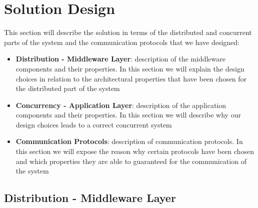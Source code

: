\section{Solution Design}

This section will describe the solution in terms of the distributed and concurrent parts of the system and the communication protocols that we have designed:

\begin{itemize}
\item \textbf{Distribution - Middleware Layer}: 
	description of the middleware components and their properties. In this section we will explain the design choices in relation to the architectural properties that have been chosen 
	for the distributed part of the system
\item \textbf{Concurrency - Application Layer}: 
	description of the application components and their properties. In this section we will describe why our design choices leads to a correct concurrent system 
\item \textbf{Communication Protocols}: 
	description of communication protocols. In this section we will expose the reason why certain protocols have been chosen and which properties they are able to guaranteed for 
	the communication of the system
\end{itemize}

\subsection{Distribution - Middleware Layer}






